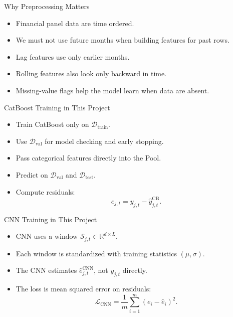 \documentclass[aspectratio=169]{beamer}
\newcommand{\D}{\mathcal{D}}
\newcommand{\haty}{\hat{y}}
\newcommand{\loss}{\mathcal{L}}
\newcommand{\seq}{\mathcal{S}}
\begin{document}
\begin{frame}{Why Preprocessing Matters}
  \begin{itemize}
    \item Financial panel data are time ordered.
    \item We must not use future months when building features for past rows.
    \item Lag features use only earlier months.
    \item Rolling features also look only backward in time.
    \item Missing-value flags help the model learn when data are absent.
  \end{itemize}
\end{frame}

\begin{frame}{CatBoost Training in This Project}
  \begin{itemize}
    \item Train CatBoost only on $\D_{\mathrm{train}}$.
    \item Use $\D_{\mathrm{val}}$ for model checking and early stopping.
    \item Pass categorical features directly into the Pool.
    \item Predict on $\D_{\mathrm{val}}$ and $\D_{\mathrm{test}}$.
    \item Compute residuals:
    \[
      e_{j,t} = y_{j,t} - \haty^{\mathrm{CB}}_{j,t}.
    \]
  \end{itemize}
\end{frame}

\begin{frame}{CNN Training in This Project}
  \begin{itemize}
    \item CNN uses a window $\seq_{j,t} \in \mathbb{R}^{d \times L}$.
    \item Each window is standardized with training statistics $(\mu,\sigma)$.
    \item The CNN estimates $\hat e^{\mathrm{CNN}}_{j,t}$, not $y_{j,t}$ directly.
    \item The loss is mean squared error on residuals:
    \[
      \loss_{\mathrm{CNN}} = \frac{1}{m} \sum_{i=1}^{m} (e_i - \hat e_i)^2.
    \]
  \end{itemize}
\end{frame}
\end{document}
